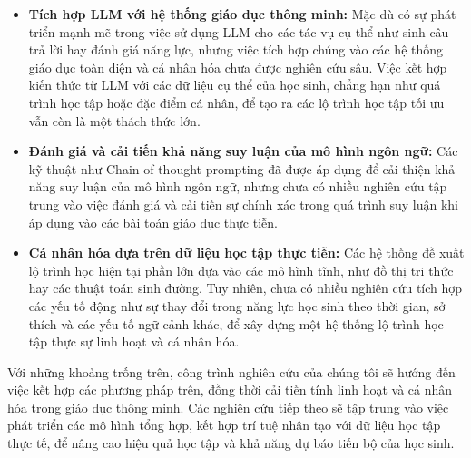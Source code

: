 \begin{itemize}
    \item \textbf{Tích hợp LLM với hệ thống giáo dục thông minh:} Mặc dù có sự phát triển mạnh mẽ trong việc sử dụng LLM cho các tác vụ cụ thể như sinh câu trả lời hay đánh giá năng lực, nhưng việc tích hợp chúng vào các hệ thống giáo dục toàn diện và cá nhân hóa chưa được nghiên cứu sâu. Việc kết hợp kiến thức từ LLM với các dữ liệu cụ thể của học sinh, chẳng hạn như quá trình học tập hoặc đặc điểm cá nhân, để tạo ra các lộ trình học tập tối ưu vẫn còn là một thách thức lớn.
    
    \item \textbf{Đánh giá và cải tiến khả năng suy luận của mô hình ngôn ngữ:} Các kỹ thuật như Chain-of-thought prompting đã được áp dụng để cải thiện khả năng suy luận của mô hình ngôn ngữ, nhưng chưa có nhiều nghiên cứu tập trung vào việc đánh giá và cải tiến sự chính xác trong quá trình suy luận khi áp dụng vào các bài toán giáo dục thực tiễn.

    \item \textbf{Cá nhân hóa dựa trên dữ liệu học tập thực tiễn:} Các hệ thống đề xuất lộ trình học hiện tại phần lớn dựa vào các mô hình tĩnh, như đồ thị tri thức hay các thuật toán sinh đường. Tuy nhiên, chưa có nhiều nghiên cứu tích hợp các yếu tố động như sự thay đổi trong năng lực học sinh theo thời gian, sở thích và các yếu tố ngữ cảnh khác, để xây dựng một hệ thống lộ trình học tập thực sự linh hoạt và cá nhân hóa.
\end{itemize}

Với những khoảng trống trên, công trình nghiên cứu của chúng tôi sẽ hướng đến việc kết hợp các phương pháp trên, đồng thời cải tiến tính linh hoạt và cá nhân hóa trong giáo dục thông minh. Các nghiên cứu tiếp theo sẽ tập trung vào việc phát triển các mô hình tổng hợp, kết hợp trí tuệ nhân tạo với dữ liệu học tập thực tế, để nâng cao hiệu quả học tập và khả năng dự báo tiến bộ của học sinh.
